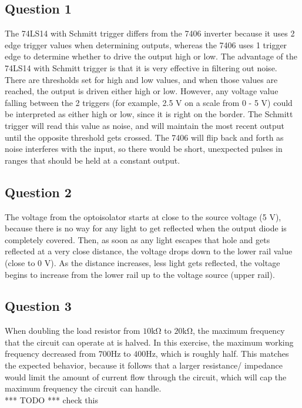 \documentclass[CMPE]{KGCOEReport}
\begin{document}
\subsection*{Question 1}
The 74LS14 with Schmitt trigger differs from the 7406 inverter because it uses 2 edge trigger values when determining outputs, whereas the 7406 uses 1 trigger edge to determine whether to drive the output high or low. The advantage of the 74LS14 with Schmitt trigger is that it is very effective in filtering out noise. There are thresholds set for high and low values, and when those values are reached, the output is driven either high or low. However, any voltage value falling between the 2 triggers (for example, 2.5 \si{\volt} on a scale from 0 - 5 \si{\volt}) could be interpreted as either high or low, since it is right on the border. The Schmitt trigger will read this value as noise, and will maintain the most recent output until the opposite threshold gets crossed. The 7406 will flip back and forth as noise interferes with the input, so there would be short, unexpected pulses in ranges that should be held at a constant output.  
\subsection*{Question 2}
The voltage from the optoisolator starts at close to the source voltage (5 \si{\volt}), because there is no way for any light to get reflected when the output diode is completely covered. Then, as soon as any light escapes that hole and gets reflected at a very close distance, the voltage drops down to the lower rail value (close to 0 \si{\volt}). As the distance increases, less light gets reflected, the voltage begins to increase from the lower rail up to the voltage source (upper rail). 
\subsection*{Question 3}
When doubling the load resistor from $10\si{\kilo\ohm}$ to $20\si{\kilo\ohm}$, the maximum frequency that the circuit can operate at is halved. In this exercise, the maximum working frequency decreased from $700 \si{\hertz}$ to $400 \si{\hertz}$, which is roughly half. This matches the expected behavior, because it follows that a larger resistance/ impedance would limit the amount of current flow through the circuit, which will cap the maximum frequency the circuit can handle. 
\\ *** TODO *** check this

\newpage
%
\end{document}
